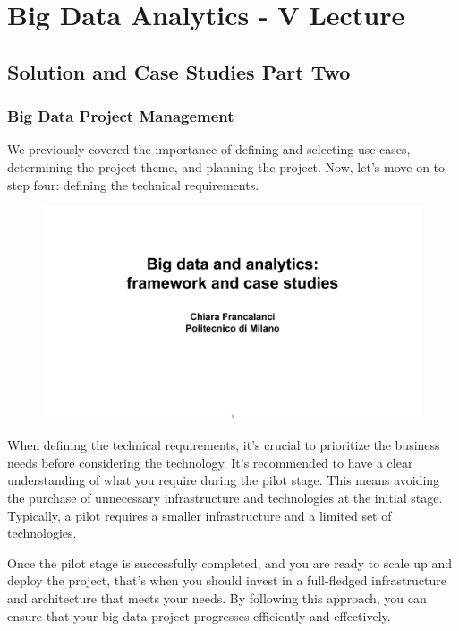 \section{Big Data Analytics - V Lecture}

\subsection{Solution and Case Studies Part Two}

\subsubsection{Big Data Project Management}

We previously covered the
importance of defining and selecting use cases, determining the project
theme, and planning the project. Now, let's move on to step four:
defining the technical requirements.

\begin{figure}[!h]
  \centering
  \includegraphics[page=88, trim = 0cm 3cm 1.5cm 4.5cm, clip, width=\imagewidth]{images/06 - BIG_DATA.pdf}
\end{figure}

When defining the technical requirements, it's crucial to prioritize the
business needs before considering the technology. It's recommended to
have a clear understanding of what you require during the pilot stage.
This means avoiding the purchase of unnecessary infrastructure and
technologies at the initial stage. Typically, a pilot requires a smaller
infrastructure and a limited set of technologies.

Once the pilot stage is successfully completed, and you are ready to
scale up and deploy the project, that's when you should invest in a
full-fledged infrastructure and architecture that meets your needs. By
following this approach, you can ensure that your big data project
progresses efficiently and effectively.

